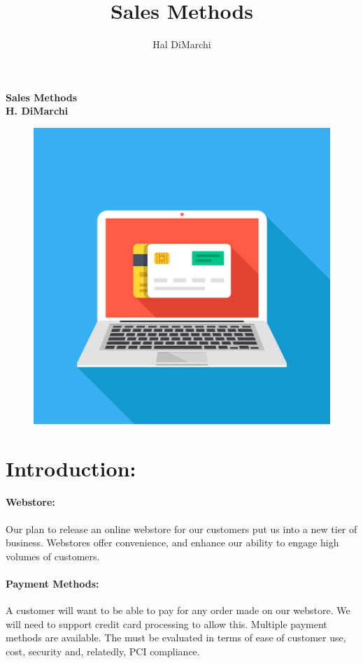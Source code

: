 \documentclass[letterpaper]{article}
\title{Sales Methods}
\author{Hal DiMarchi}
\begin{document}
  \pagecolor{cyan!30}
  \begin{titlepage}
    \centering
    \vfill
    {\bfseries\Large
        Sales Methods\\
        H. DiMarchi\\
    }
    \vfill
    \begin{figure}[h!]
      \includegraphics[width=\textwidth]{best-online-credit-card-processing}
    \end{figure}
    \vfill
    \vfill

  \end{titlepage}
  \tableofcontents
  \newpage
  \section{Introduction:}
    \paragraph{Webstore:}
    Our plan to release an online webstore for our customers put us into a new
    tier of business. Webstores offer convenience, and enhance
    our ability to engage high volumes of customers.
    \paragraph{Payment Methods:}
    A customer will want to be able to pay for any order made on our webstore. We will need to support
    credit card processing to allow this. Multiple payment methods are available. The must be evaluated
    in terms of ease of customer use, cost, security and, relatedly, PCI compliance.
\end{document}
